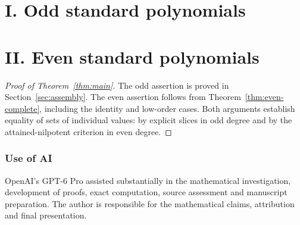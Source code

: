 \documentclass[11pt]{amsart}
\begin{document}
\part*{I. Odd standard polynomials}

\part*{II. Even standard polynomials}


\begin{proof}[Proof of Theorem~\ref{thm:main}]
The odd assertion is proved in Section~\ref{sec:assembly}. The even
assertion follows from Theorem~\ref{thm:even-complete}, including the
identity and low-order cases. Both arguments establish equality of
sets of individual values: by explicit slices in odd degree and by
the attained-nilpotent criterion in even degree.
\end{proof}

\section*{Use of AI}
OpenAI's GPT-6 Pro assisted substantially in the mathematical
investigation, development of proofs, exact computation, source
assessment and manuscript preparation. The author is responsible for
the mathematical claims, attribution and final presentation.

\appendix


{\raggedright{}

}
\end{document}
